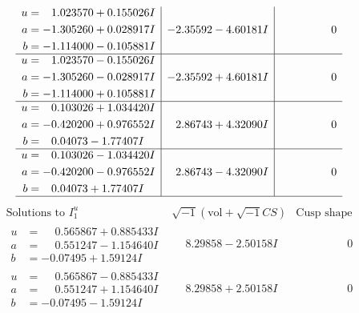 \documentclass[1p]{elsarticle_modified}
\theoremstyle{definition}
\newcommand{\I}{\sqrt{-1}}
\begin{document}
$$\begin{array}{c|c|c}
\begin{aligned}
u &= \phantom{-}1.023570 + 0.155026 I \\
a &= -1.305260 + 0.028917 I \\
b &= -1.114000 - 0.105881 I\end{aligned}
 & -2.35592 - 4.60181 I & \phantom{-0.000000 } 0 \\ \hline\begin{aligned}
u &= \phantom{-}1.023570 - 0.155026 I \\
a &= -1.305260 - 0.028917 I \\
b &= -1.114000 + 0.105881 I\end{aligned}
 & -2.35592 + 4.60181 I & \phantom{-0.000000 } 0 \\ \hline\begin{aligned}
u &= \phantom{-}0.103026 + 1.034420 I \\
a &= -0.420200 + 0.976552 I \\
b &= \phantom{-}0.04073 - 1.77407 I\end{aligned}
 & \phantom{-}2.86743 + 4.32090 I & \phantom{-0.000000 } 0 \\ \hline\begin{aligned}
u &= \phantom{-}0.103026 - 1.034420 I \\
a &= -0.420200 - 0.976552 I \\
b &= \phantom{-}0.04073 + 1.77407 I\end{aligned}
 & \phantom{-}2.86743 - 4.32090 I & \phantom{-0.000000 } 0\\
 \hline 
 \end{array}$$\newpage$$\begin{array}{c|c|c}  
\text{Solutions to }I^u_{1}& \I (\text{vol} + \sqrt{-1}CS) & \text{Cusp shape}\\
 \hline 
\begin{aligned}
u &= \phantom{-}0.565867 + 0.885433 I \\
a &= \phantom{-}0.551247 - 1.154640 I \\
b &= -0.07495 + 1.59124 I\end{aligned}
 & \phantom{-}8.29858 - 2.50158 I & \phantom{-0.000000 } 0 \\ \hline\begin{aligned}
u &= \phantom{-}0.565867 - 0.885433 I \\
a &= \phantom{-}0.551247 + 1.154640 I \\
b &= -0.07495 - 1.59124 I\end{aligned}
 & \phantom{-}8.29858 + 2.50158 I & \phantom{-0.000000 } 0 \\ \hline\begin{aligned}

\end{aligned}
\end{array}$$
\end{document}
